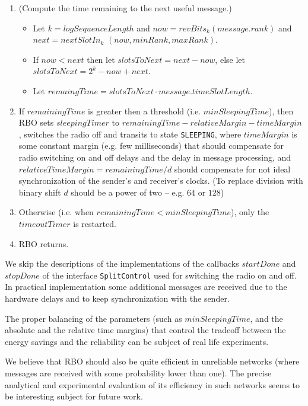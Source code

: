\documentclass{llncs}
\begin{document}
\begin{enumerate}
\item
  (Compute the time remaining to the next useful message.)
  \begin{itemize}
    \item
      Let $k=logSequenceLength$ and $now=revBits_{k}(message.rank)$ 
      and $next= nextSlotIn_{k}$ $( now, minRank, maxRank)$.
    \item
      If $now<next$ then let $slotsToNext=next-now$, else let $slotsToNext=2^{k}-now+next$.
    \item
      Let $remaingTime=slotsToNext\cdot message.timeSlotLength$.
  \end{itemize}
\item
  If $remainingTime$ is greater then a threshold (i.e. $minSleepingTime$),
  then RBO sets $sleepingTimer$ to $remainingTime-relativeMargin-timeMargin$,
  switches the radio off and transits to state \verb|SLEEPING|,
  where $timeMargin$ is some constant margin (e.g. few milliseconds) 
  that should compensate for radio switching on and off delays and the delay in
  message processing, and $relativeTimeMargin=remainingTime/d$ 
  should compensate for not ideal synchronization of the sender's and receiver's
  clocks. 
  (To replace division with binary shift $d$ should be a power of two -- e.g. $64$ or $128$)

\item
Otherwise  (i.e. when $remainingTime < minSleepingTime$), 
only the $timeoutTimer$ is restarted.

\item
RBO returns.

\end{enumerate}
We skip the descriptions of the implementations of the callbacks $startDone$
and $stopDone$ of the interface \verb|SplitControl| used for switching the radio on and off.
In practical implementation some  additional messages are received
due to the hardware delays and to keep synchronization with the sender.

The proper balancing of the parameters 
(such as $minSleepingTime$, and the absolute and the relative time margins)
that control the tradeoff between
the energy savings and the reliability can be subject of real life experiments.

We believe that RBO should also be quite efficient in unreliable networks
(where messages are received with some probability lower than one).
The precise analytical and experimental evaluation of
its efficiency in such networks seems to be interesting subject
for future work.



 






\newpage


\end{document}
